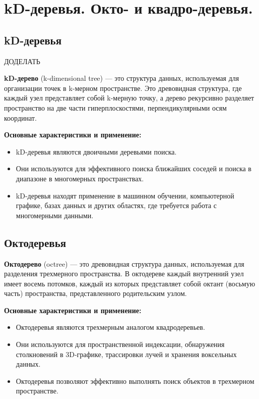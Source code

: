 \section{kD-деревья. Окто- и квадро-деревья.}

\subsection{kD-деревья}

ДОДЕЛАТЬ
\begin{definition}
	\textbf{kD-дерево} (k-dimensional tree) --- это структура данных, используемая для организации точек в k-мерном пространстве. Это древовидная структура, где каждый узел представляет собой k-мерную точку, а дерево рекурсивно разделяет пространство на две части гиперплоскостями, перпендикулярными осям координат.
\end{definition}

\noindent \textbf{Основные характеристики и применение:}
\begin{itemize}
	\item kD-деревья являются двоичными деревьями поиска.
	\item Они используются для эффективного поиска ближайших соседей и поиска в диапазоне в многомерных пространствах.
	\item kD-деревья находят применение в машинном обучении, компьютерной графике, базах данных и других областях, где требуется работа с многомерными данными.
\end{itemize}

\subsection{Октодеревья}

\begin{definition}
	\textbf{Октодерево} (octree) --- это древовидная структура данных, используемая для разделения трехмерного пространства. В октодереве каждый внутренний узел имеет восемь потомков, каждый из которых представляет собой октант (восьмую часть) пространства, представленного родительским узлом.
\end{definition}

\noindent \textbf{Основные характеристики и применение:}
\begin{itemize}
	\item Октодеревья являются трехмерным аналогом квадродеревьев.
	\item Они используются для пространственной индексации, обнаружения столкновений в 3D-графике, трассировки лучей и хранения воксельных данных.
	\item Октодеревья позволяют эффективно выполнять поиск объектов в трехмерном пространстве.
\end{itemize}


